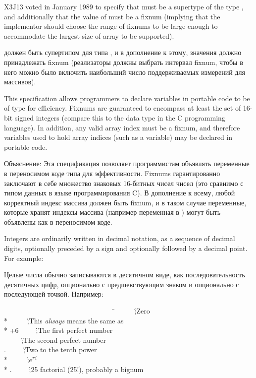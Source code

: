 \begin{new}
X3J13 voted in January 1989
to specify that  must be a supertype
of the type , and additionally that the value
of  must be a fixnum (implying that the implementor
should choose the range of fixnums to be large enough to accommodate the
largest size of array to be supported).

 должен быть супертипом для типа ,
и в дополнение к этому, значения  должно
принадлежать fixnum (реализаторы должны выбрать интервал fixnum,
чтобы в него можно было включить наибольший число поддерживаемых
измерений для массивов). 

\beforenoterule
\begin{rationale}
This specification allows programmers to declare variables in portable code
to be of type  for efficiency.  Fixnums are guaranteed to
encompass at least the set of 16-bit signed integers
(compare this to the data type  in the C programming language).
In addition, any valid array index must be a fixnum, and therefore variables
used to hold array indices (such as a  variable)
may be declared  in portable code.

Объяснение: Эта спецификация позволяет программистам объявлять
переменные в переносимом коде типа  для
эффективности. Fixnums гарантированно заключают в себе множество
знаковых 16-битных чисел чисел (это сравнимо с типом
данных  в языке программирования C). В дополнение к
всему, любой корректный индекс массива должен быть fixnum, и в
таком случае переменные, которые хранят индексы массива (например
переменная в ) могут быть объявлены как  в
переносимом коде. 
\end{rationale}
\afternoterule
\end{new}

Integers are ordinarily written in decimal notation, as a sequence
of decimal digits, optionally preceded by a sign and optionally followed
by a decimal point.
For example:

Целые числа обычно записываются в десятичном виде, как последовательность десятичных цифр, опционально с предшевствующим знаком и опционально с последующей точкой. Например:
\begin{lisp}
~~~~~~~~~~~~~~~~~~~~~~~~~~~~~~~~\=\kill
{}~~~~~\';{\rm Zero} \\*
~~~~~\';{\rm This {\it always} means the same as } \\*
\>+6~~~~~\';{\rm The first perfect number} \\
~~~~~\';{\rm The second perfect number} \\
.~~~~~\';{\rm Two to the tenth power} \\*
~~~~~\';{\rm \(e^{\pi i}\)} \\*
.~~~~~\';{\rm 25 factorial (25!), probably a bignum}
\end{lisp}

